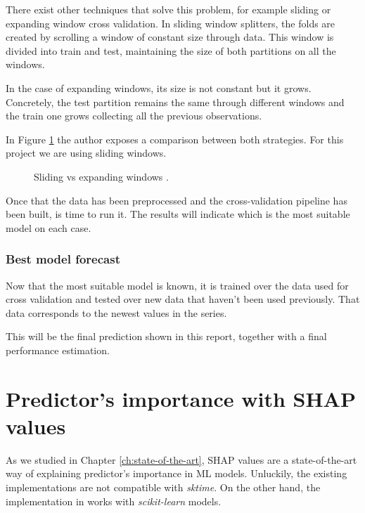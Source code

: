 There exist other techniques that solve this problem, for example sliding or expanding window cross validation.
In sliding window splitters, the folds are created by scrolling a window of constant size through data.
This window is divided into train and test, maintaining the size of both partitions on all the windows.

In the case of expanding windows, its size is not constant but it grows. Concretely, the test partition remains the same through different windows and the train one grows collecting all the previous observations.

In Figure \ref{fig:sliding-expanding-windows} the author exposes a comparison between both strategies. For this project we are using sliding windows.

\begin{figure}[H]
\centering
    \caption{Sliding vs expanding windows \cite{sliding-expanding-windows}.}
    \label{fig:sliding-expanding-windows}
\end{figure}

Once that the data has been preprocessed and the cross-validation pipeline has been built, is time to run it.
The results will indicate which is the most suitable model on each case.

\subsubsection{Best model forecast}
Now that the most suitable model is known, it is trained over the data used for cross validation and tested  over new data that haven't been used previously.
That data corresponds to the newest values in the series.

This will be the final prediction shown in this report, together with a final performance estimation.

\section{Predictor's importance with SHAP values}
As we studied in Chapter \ref{ch:state-of-the-art}, SHAP values are a state-of-the-art way of explaining predictor's importance in ML models. Unluckily, the existing implementations are not compatible with \textit{sktime}. On the other hand, the implementation in \cite{shap-package} works with \textit{scikit-learn} models.

